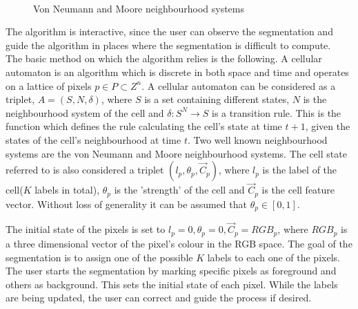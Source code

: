\documentclass[a4paper,10pt]{article}
\begin{document}
\begin{figure}[H]
\centering
\mbox{ \quad
{}} \caption{Von Neumann and
Moore neighbourhood systems \cite{n}}
\end{figure}

The algorithm is interactive, since the user can observe the segmentation and
guide the algorithm in places where the segmentation is difficult to compute.
\\

\noindent The basic method on which the algorithm relies is the following.  A
cellular automaton is an algorithm which is discrete in both space and time
and operates on a lattice of pixels $p \in P \subset Z^{n}$.  A cellular
automaton can be considered as a triplet, $A = (S, N, \delta)$, where $S$ is a
set containing different states, $N$ is the
neighbourhood system of the cell and $\delta: S^{N} \rightarrow S $ is a
transition rule.  This is the function which defines  the rule calculating the
cell's state at time $t + 1$, given the states 
of the cell's neighbourhood at time $t$.  Two well known neighbourhood systems
are the von Neumann and Moore neighbourhood systems.  The cell state referred to
is also
considered a triplet $(l_{p}, \theta_{p}, \overrightarrow{C}_{p})$, where
$l_{p}$ is the label of the cell($K$ labels in total), $\theta_{p}$ is the
'strength' of the cell and $\overrightarrow{C}_{p}$ is
the cell feature vector.  Without loss of generality it can be assumed that
$\theta_{p} \in [0,1]$. 

The initial state of the pixels is set to $l_{p} = 0, \theta_{p} = 0,
\overrightarrow{C}_{p} = RGB_{p}$, where $RGB_{p}$ is a three dimensional vector
of the pixel's colour in 
the RGB space.  The goal of the segmentation is to assign one of the possible
$K$ labels to each one of the pixels.  The user starts the segmentation by
marking specific pixels as foreground and others as background.  This sets the
initial state of each pixel.  While the labels are being updated, the user can
correct and guide the process if desired.  \\
\end{document}
